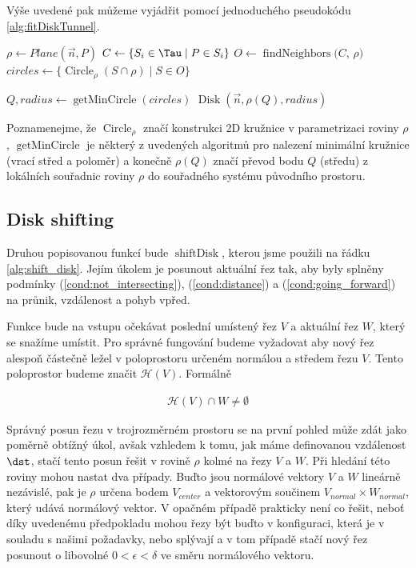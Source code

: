 Výše uvedené pak můžeme vyjádřit pomocí jednoduchého pseudokódu \ref{alg:fitDiskTunnel}.

\begin{algorithmic}[1]
\label{alg:fitDiskTunnel}

    \State $ \rho \gets Plane(\vec{n}, P) $
    \State $ C \gets \{S_i \in \Tau \mid P \in S_i \} $
    \State $ O \gets \operatorname{findNeighbors}(C$, $\rho)$
    \State $ circles \gets \{ \operatorname{Circle}_{\rho}(S \cap \rho) \mid S \in O \} $
    \State

    \State $ Q, radius \gets \operatorname{getMinCircle}(circles) $
    \State \Return $ \operatorname{Disk}(\vec{n}, \rho(Q), radius) $
\EndFunction

\end{algorithmic}

Poznamenejme, že $ \operatorname{Circle}_{\rho} $ značí konstrukci 2D kružnice
v parametrizaci roviny $ \rho $, $ \operatorname{getMinCircle} $ je některý z
uvedených algoritmů pro nalezení minimální kružnice (vrací střed a poloměr)
a konečně $ \rho(Q) $ značí převod bodu $ Q $ (středu) z lokálních souřadnic
roviny $ \rho $ do souřadného systému původního prostoru.



\subsection{Disk shifting} \label{subsec:disk_shift}
Druhou popisovanou funkcí bude $ \operatorname{shiftDisk} $, kterou jsme použili
na řádku \ref{alg:shift_disk}. Jejím úkolem je posunout aktuální řez tak, aby
byly splněny podmínky (\ref{cond:not_intersecting}), (\ref{cond:distance})
a (\ref{cond:going_forward}) na průnik, vzdálenost a pohyb vpřed.

Funkce bude na vstupu očekávat poslední umístený řez $ V $ a aktuální řez $ W $,
který se snažíme umístit. Pro správné fungování budeme vyžadovat aby nový řez
alespoň částečně ležel v poloprostoru určeném normálou a středem řezu $ V $.
Tento poloprostor budeme značit $ \mathcal{H}(V) $. Formálně

\begin{align} \label{cond:halfspace}
    \mathcal{H}(V) \cap W \neq \emptyset
\end{align}

Správný posun řezu v trojrozměrném prostoru se na první pohled může zdát jako
poměrně obtížný úkol, avšak vzhledem k tomu, jak máme definovanou vzdálenost $ \dst $,
stačí tento posun řešit v rovině $ \rho $ kolmé na řezy $ V $ a $ W $. Při hledání této
roviny mohou nastat dva případy. Buďto jsou normálové vektory $ V $ a $ W $ lineárně
nezávislé, pak je $ \rho $ určena bodem $ V_{center} $ a vektorovým součinem
$ V_{normal} \times W_{normal} $, který udává normálový vektor. V opačném případě
prakticky není co řešit, neboť díky uvedenému předpokladu mohou řezy být buďto
v konfiguraci, která je v souladu s našimi požadavky, nebo splývají a v tom
případě stačí nový řez posunout o libovolné $ 0 < \epsilon < \delta $ ve směru
normálového vektoru.

